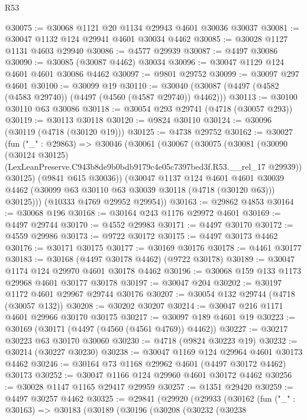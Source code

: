 \begin{lexlean}{R53}
\begin{coremodule}
@30075 := @30068 @1121 @20 @1134 @29943 @4601 @30036 @30037
@30081 := @30047 @1132 @124 @29941 @4601 @30034 @4462
@30085 := @30028 @1127 @1131 @4603 @29940
@30086 := @4577 @29939
@30087 := @4497 @30086
@30090 := @30085 (@30087 @4462) @30034
@30096 := @30047 @1129 @124 @4601 @4601 @30086 @4462
@30097 := @9801 @29752
@30099 := @30097 @297 @4601
@30100 := @30099 @19
@30110 := @30040 (@30087 (@4497 (@4582 (@4583 @29740)) (@4497 (@4560 (@4587 @29740)) @4462)))
@30113 := @30100 @30110 @63 @30086
@30118 := @30054 @293 @29741 (@4718 (@30057 @293))
@30119 := @30113 @30118
@30120 := @9824 @30110
@30124 := @30096 (@30119 (@4718 (@30120 @19)))
@30125 := @4738 @29752
@30162 := @30027
    (fun ("_" : @29863) =>
    @30046
      (@30061
        (@30067
          (@30075
            (@30081
              (@30090
                (@30124 @30125)
                (LexLeanPreserve.C943b8de9b0bdb9179c4e05c7397bed3f.R53.__rel_17 @29939))
              @30125)
            (@9841 @615 @30036))
          (@30047
            @1137
            @124
            @4601
            @4601
            @30039
            @4462
            (@30099 @63 @30110 @63 @30039 @30118 (@4718 (@30120 @63)))
            @30125)))
      (@10333 @4769 @29952 @29954))
@30163 := @29862 @4853
@30164 := @30068 @196
@30168 := @30164 @243 @1176 @29972 @4601
@30169 := @4497 @29744
@30170 := @4552 @29983
@30171 := @4497 @30170
@30172 := @4559 @29986
@30173 := @9722 @30172
@30175 := @4497 @30173 @4462
@30176 := @30171 @30175
@30177 := @30169 @30176
@30178 := @4461 @30177
@30183 := @30168 (@4497 @30178 @4462) (@9722 @30178)
@30189 := @30047 @1174 @124 @29970 @4601 @30178 @4462
@30196 := @30068 @159 @133 @1173 @29968 @4601 @30177 @30178
@30197 := @30047 @204
@30202 := @30197 @1172 @4601 @29967 @29744 @30176
@30207 := @30054 @132 @29744 (@4718 (@30057 @132))
@30208 := @30202 @30207
@30214 := @30047 @216 @1171 @4601 @29966 @30170 @30175
@30217 := @30097 @189 @4601 @19
@30223 := @30169 (@30171 (@4497 (@4560 (@4561 @4769)) @4462))
@30227 := @30217 @30223 @63 @30170 @30060
@30230 := @4718 (@9824 @30223 @19)
@30232 := @30214 (@30227 @30230)
@30238 := @30047 @1169 @124 @29964 @4601 @30173 @4462
@30246 := @30164 @73 @1168 @29962 @4601 (@4497 @30172 @4462) @30173
@30252 := @30047 @1166 @124 @29960 @4601 @30172 @4462
@30256 := @30028 @1147 @1165 @29417 @29959
@30257 := @1351 @29420
@30259 := @4497 @30257 @4462
@30325 := @29841
    (@29920
      (@29933
        (@30162
          (fun ("_" : @30163) =>
          @30183
            (@30189
              (@30196
                (@30208
                  (@30232
                    (@30238

\end{coremodule}
\end{lexlean}
